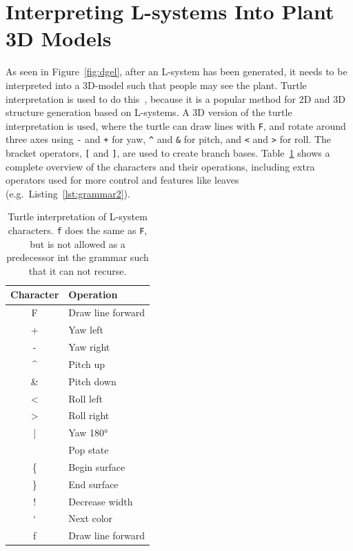 \section{Interpreting L-systems Into Plant 3D Models}
\label{sec:interpreting}
As seen in Figure~\ref{fig:dgel}, after an \gls{L-system} has been generated, it needs to be interpreted into a 3D-model such that people may see the plant.
Turtle interpretation is used to do this~\cite{2012Prusinkiewicz}, because it is a popular method for 2D and 3D structure generation based on \glspl{L-system}.
A 3D version of the turtle interpretation is used, where the turtle can draw lines with \texttt{F}, and rotate around three axes using \texttt{-} and \texttt{+} for yaw, \texttt{\textasciicircum} and \texttt{\&} for pitch, and \texttt{<} and \texttt{>} for roll.
The bracket operators, \texttt{[} and \texttt{]}, are used to create \glspl{branch base}.
Table~\ref{tab:turtle-cmd} shows a complete overview of the characters and their operations, including extra operators used for more control and features like leaves (e.g.\ Listing~\ref{lst:grammar2}).

\begin{table}
    \centering
    \begin{tabular}{| c | l |}
    \hline
    \textbf{Character} & \textbf{Operation} \\ \hline
    F & Draw line forward \\ \hline
    + & Yaw left \\ \hline
    - & Yaw right \\ \hline
    \textasciicircum & Pitch up \\ \hline
    \& & Pitch down \\ \hline
    < & Roll left \\ \hline
    > & Roll right \\ \hline
    | & Yaw 180° \\ \hline
    [ & Push state \\ \hline
    ] & Pop state \\ \hline
    \{ & Begin surface \\ \hline
    \} & End surface \\ \hline
    ! & Decrease width \\ \hline
    ` & Next color \\ \hline
    f & Draw line forward \\
    \hline
    \end{tabular}
    \caption[Turtle interpretation of L-system characters]{Turtle interpretation of \gls{L-system} characters. \texttt{f} does the same as \texttt{F}, but is not allowed as a predecessor int the grammar such that it can not recurse.}
    \label{tab:turtle-cmd}
\end{table}

